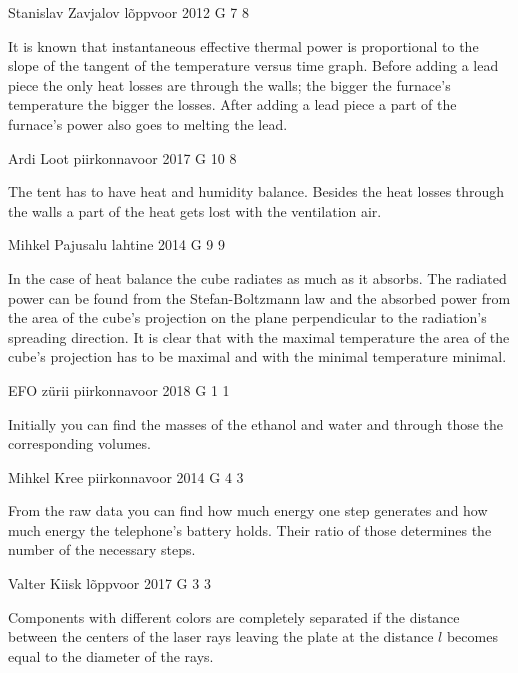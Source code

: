 \documentclass[11pt]{article}
\begin{document}
{Stanislav Zavjalov} %
{lõppvoor} %
{2012} %
{G 7} %
{8} %
{

\ifEngHint
It is known that instantaneous effective thermal power is proportional to the slope of the tangent of the temperature versus time graph. Before adding a lead piece the only heat losses are through the walls; the bigger the furnace’s temperature the bigger the losses. After adding a lead piece a part of the furnace’s power also goes to melting the lead.
\fi
}

{Ardi Loot} %
{piirkonnavoor} %
{2017} %
{G 10} %
{8} %
{

\ifEngHint
The tent has to have heat and humidity balance. Besides the heat losses through the walls a part of the heat gets lost with the ventilation air.
\fi
}

{Mihkel Pajusalu} %
{lahtine} %
{2014} %
{G 9} %
{9} %
{

\ifEngHint
In the case of heat balance the cube radiates as much as it absorbs. The radiated power can be found from the Stefan-Boltzmann law and the absorbed power from the area of the cube’s projection on the plane perpendicular to the radiation’s spreading direction. It is clear that with the maximal temperature the area of the cube’s projection has to be maximal and with the minimal temperature minimal.
\fi
}

{EFO zürii} %
{piirkonnavoor} %
{2018} %
{G 1} %
{1} %
{

\ifEngHint
Initially you can find the masses of the ethanol and water and through those the corresponding volumes.
\fi
}

{Mihkel Kree} %
{piirkonnavoor} %
{2014} %
{G 4} %
{3} %
{

\ifEngHint
From the raw data you can find how much energy one step generates and how much energy the telephone’s battery holds. Their ratio of those determines the number of the necessary steps.
\fi
}

{Valter Kiisk} %
{lõppvoor} %
{2017} %
{G 3} %
{3} %
{

\ifEngHint
Components with different colors are completely separated if the distance between the centers of the laser rays leaving the plate at the distance $l$ becomes equal to the diameter of the rays.
\fi
}
\end{document}

